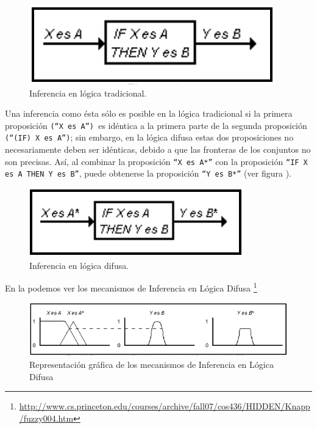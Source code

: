 \begin{figure}[H]
	\centering
	\includegraphics[scale=0.5]{images/logica_difusa.png}
	\caption{Inferencia en lógica tradicional.}
	\label{fig:inf}
\end{figure}

Una inferencia como ésta sólo es posible en
la lógica tradicional si la primera proposición \texttt{(``X es A'') }es idéntica a la
primera parte de la segunda proposición \texttt{(``(IF) X es A'')}; sin embargo, en la
lógica difusa estas dos proposiciones no necesariamente deben ser
idénticas, debido a que las fronteras de los conjuntos no son precisas. Así, al
combinar la proposición \texttt{``X es A*''} con la proposición \texttt{``IF X es A THEN Y es
B''}, puede obtenerse la proposición \texttt{``Y es B*''} (ver figura ).

\begin{figure}[H]
	\centering
	\includegraphics[scale=0.67]{images/logica_difusa_1.png}
	\caption{Inferencia en lógica difusa.}
	\label{fig:inf1}
\end{figure}

En la  podemos ver los mecanismos de Inferencia en Lógica Difusa \footnote{\url{http://www.cs.princeton.edu/courses/archive/fall07/cos436/HIDDEN/Knapp/fuzzy004.htm}}

\begin{figure}[H]
	\centering
	\includegraphics[scale=0.67]{images/mecanismos_inferencias_logica_difusa.png}
	\caption{Representación gráfica de los mecanismos de Inferencia en Lógica Difusa}
	\label{fig:inferencia}
\end{figure}


